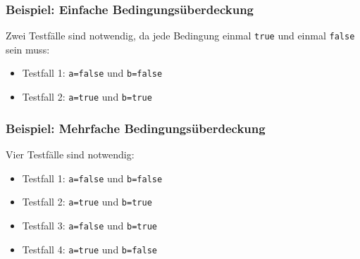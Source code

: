 
\begin{frame}[fragile]
\frametitle{Beispiel: Einfache Bedingungsüberdeckung}
\begin{block}{}

Zwei Testfälle sind notwendig, da jede Bedingung einmal \lstinline{true} und einmal \lstinline{false} sein muss:
\begin{itemize}
  \item Testfall 1: \lstinline{a=false} und \lstinline{b=false}
  \item Testfall 2: \lstinline{a=true} und \lstinline{b=true}
\end{itemize}
\end{block}
\end{frame}

\begin{frame}[fragile]
\frametitle{Beispiel: Mehrfache Bedingungsüberdeckung}
\begin{block}{}

Vier Testfälle sind notwendig:
\begin{itemize}
  \item Testfall 1: \lstinline{a=false} und \lstinline{b=false}
  \item Testfall 2: \lstinline{a=true} und \lstinline{b=true}
  \item Testfall 3: \lstinline{a=false} und \lstinline{b=true}
  \item Testfall 4: \lstinline{a=true} und \lstinline{b=false}
\end{itemize}
\end{block}
\end{frame}

